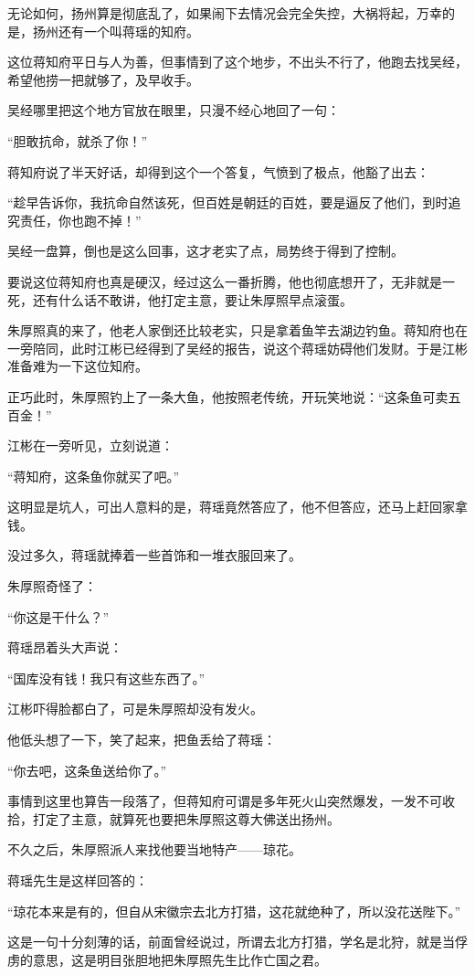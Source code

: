 \begin{multicols}{\theparacolNo}
无论如何，扬州算是彻底乱了，如果闹下去情况会完全失控，大祸将起，万幸的是，扬州还有一个叫蒋瑶的知府。

这位蒋知府平日与人为善，但事情到了这个地步，不出头不行了，他跑去找吴经，希望他捞一把就够了，及早收手。

吴经哪里把这个地方官放在眼里，只漫不经心地回了一句：

“胆敢抗命，就杀了你！”

蒋知府说了半天好话，却得到这个一个答复，气愤到了极点，他豁了出去：

“趁早告诉你，我抗命自然该死，但百姓是朝廷的百姓，要是逼反了他们，到时追究责任，你也跑不掉！”

吴经一盘算，倒也是这么回事，这才老实了点，局势终于得到了控制。

要说这位蒋知府也真是硬汉，经过这么一番折腾，他也彻底想开了，无非就是一死，还有什么话不敢讲，他打定主意，要让朱厚照早点滚蛋。

朱厚照真的来了，他老人家倒还比较老实，只是拿着鱼竿去湖边钓鱼。蒋知府也在一旁陪同，此时江彬已经得到了吴经的报告，说这个蒋瑶妨碍他们发财。于是江彬准备难为一下这位知府。

正巧此时，朱厚照钓上了一条大鱼，他按照老传统，开玩笑地说：“这条鱼可卖五百金！”

江彬在一旁听见，立刻说道：

“蒋知府，这条鱼你就买了吧。”

这明显是坑人，可出人意料的是，蒋瑶竟然答应了，他不但答应，还马上赶回家拿钱。

没过多久，蒋瑶就捧着一些首饰和一堆衣服回来了。

朱厚照奇怪了：

“你这是干什么？”

蒋瑶昂着头大声说：

“国库没有钱！我只有这些东西了。”

江彬吓得脸都白了，可是朱厚照却没有发火。

他低头想了一下，笑了起来，把鱼丢给了蒋瑶：

“你去吧，这条鱼送给你了。”

事情到这里也算告一段落了，但蒋知府可谓是多年死火山突然爆发，一发不可收拾，打定了主意，就算死也要把朱厚照这尊大佛送出扬州。

不久之后，朱厚照派人来找他要当地特产——琼花。

蒋瑶先生是这样回答的：

“琼花本来是有的，但自从宋徽宗去北方打猎，这花就绝种了，所以没花送陛下。”

这是一句十分刻薄的话，前面曾经说过，所谓去北方打猎，学名是北狩，就是当俘虏的意思，这是明目张胆地把朱厚照先生比作亡国之君。


\end{multicols}
